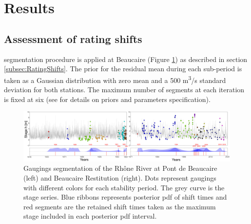 \documentclass[11pt]{article}
\begin{document}
 \section{Results}
 \label{sec:Results}
 
    \subsection{Assessment of rating shifts}

    \citet{darienzo_detection_2021} segmentation procedure is applied at Beaucaire (Figure \ref{fig:SegmBoth}) as described in section \ref{subsec:RatingShifts}. The prior for the residual mean during each sub-period is taken as a Gaussian distribution with zero mean and a 500 m\textsuperscript{3}/s standard deviation for both stations. The maximum number of segments at each iteration is fixed at six (see \citet{darienzo_detection_2021} for details on priors and parameters specification).

    \begin{figure}[h!]
        \centering
        \includegraphics[width = 1\linewidth]{Figs/6-SegmBoth.png}
        \caption{Gaugings segmentation of the Rhône River at Pont de Beaucaire (left) and Beaucaire Restitution (right). Dots represent gaugings with different colors for each stability period. The grey curve is the stage series. Blue ribbons represents posterior pdf of shift times and red segments are the retained shift times taken as the maximum stage included in each posterior pdf interval.}
        \label{fig:SegmBoth}
    \end{figure}
    
\end{document}
